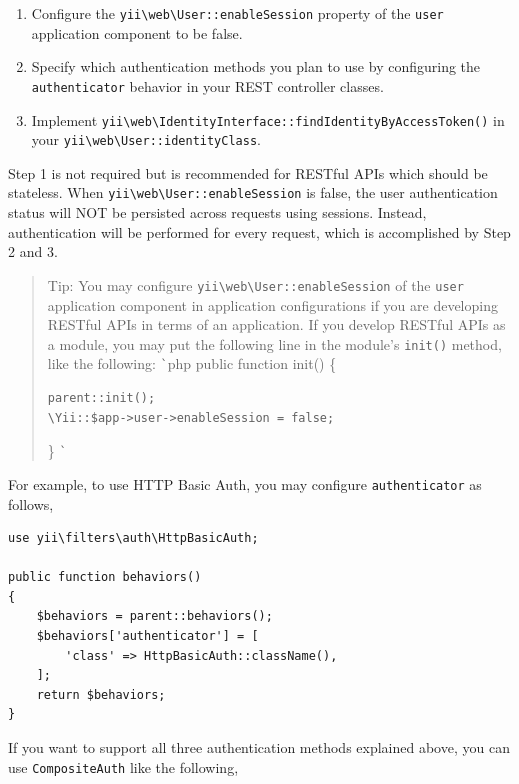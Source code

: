 \begin{enumerate}
\item Configure the \texttt{yii{\allowbreak{}\textbackslash}web{\allowbreak{}\textbackslash}User\allowbreak{}::\allowbreak{}enableSession} property of the \lstinline|user| application component to be false.
\item Specify which authentication methods you plan to use by configuring the \lstinline|authenticator| behavior
in your REST controller classes.
\item Implement \texttt{yii{\allowbreak{}\textbackslash}web{\allowbreak{}\textbackslash}IdentityInterface\allowbreak{}::\allowbreak{}findIdentityByAccessToken()} in your \texttt{yii{\allowbreak{}\textbackslash}web{\allowbreak{}\textbackslash}User\allowbreak{}::\allowbreak{}identityClass}.
\end{enumerate}
Step 1 is not required but is recommended for RESTful APIs which should be stateless. When \texttt{yii{\allowbreak{}\textbackslash}web{\allowbreak{}\textbackslash}User\allowbreak{}::\allowbreak{}enableSession}
is false, the user authentication status will NOT be persisted across requests using sessions. Instead, authentication
will be performed for every request, which is accomplished by Step 2 and 3.

\begin{quote}Tip: You may configure \texttt{yii{\allowbreak{}\textbackslash}web{\allowbreak{}\textbackslash}User\allowbreak{}::\allowbreak{}enableSession} of the \lstinline|user| application component
  in application configurations if you are developing RESTful APIs in terms of an application. If you develop
  RESTful APIs as a module, you may put the following line in the module's \lstinline|init()| method, like the following:
\lstinline|`|php
public function init()
\{

\begin{lstlisting}
parent::init();
\Yii::$app->user->enableSession = false;
\end{lstlisting}
\}
\lstinline|`|

\end{quote}
For example, to use HTTP Basic Auth, you may configure \lstinline|authenticator| as follows,

\lstset{language=php}\begin{lstlisting}
use yii\filters\auth\HttpBasicAuth;

public function behaviors()
{
    $behaviors = parent::behaviors();
    $behaviors['authenticator'] = [
        'class' => HttpBasicAuth::className(),
    ];
    return $behaviors;
}
\end{lstlisting}
If you want to support all three authentication methods explained above, you can use \lstinline|CompositeAuth| like the following,

